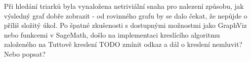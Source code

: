Při hledání triarků byla vynaložena netriviální snaha pro nalezení způsobu, jak výsledný graf dobře zobrazit - od rovinného grafu by se dalo čekat, že nepůjde o příliš složitý úkol. Po špatné zkušenosti s dostupnými možnostmi jako GraphViz nebo funkcemi v SageMath, došlo na implementaci kreslícího algoritmu založeného na Tuttově kreslení TODO zmínit odkaz a dál o kreslení nemluvit? Nebo popsat? 
